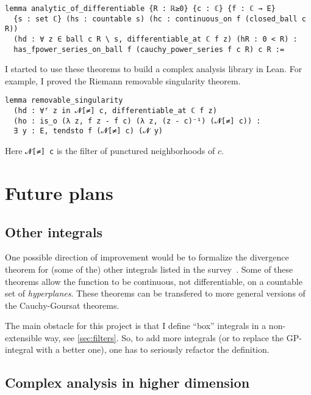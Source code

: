 \documentclass[a4paper, UKenglish,cleveref, autoref, thm-restate]{lipics-v2021}
\begin{document}
\begin{lstlisting}[caption=Analyticity of a complex differentiable function,label=lst:diff-analytic]
lemma analytic_of_differentiable {R : ℝ≥0} {c : ℂ} {f : ℂ → E}
  {s : set ℂ} (hs : countable s) (hc : continuous_on f (closed_ball c R))
  (hd : ∀ z ∈ ball c R \ s, differentiable_at ℂ f z) (hR : 0 < R) :
  has_fpower_series_on_ball f (cauchy_power_series f c R) c R :=
\end{lstlisting}

I started to use these theorems to build a complex analysis library in
Lean. For example, I proved the Riemann removable singularity theorem.

\begin{lstlisting}
lemma removable_singularity
  (hd : ∀ᶠ z in 𝓝[≠] c, differentiable_at ℂ f z)
  (ho : is_o (λ z, f z - f c) (λ z, (z - c)⁻¹) (𝓝[≠] c)) :
  ∃ y : E, tendsto f (𝓝[≠] c) (𝓝 y)
\end{lstlisting}

Here \lstinline{𝓝[≠] c} is the filter of punctured neighborhoods of
\(c\).

\section{Future plans}\label{sec:future-plans}

\subsection{Other integrals}\label{sec:other-integrals}

One possible direction of improvement would be to formalize the
divergence theorem for (some of the) other integrals listed in the
survey~\cite{BONGIORNO2002587}. Some of these theorems allow the
function to be continuous, not differentiable, on a countable set of
\emph{hyperplanes}. These theorems can be transfered to more general
versions of the Cauchy-Goursat theorems.

The main obstacle for this project is that I define \enquote{box}
integrals in a non-extensible way, see \autoref{sec:filters}. So, to
add more integrals (or to replace the GP-integral with a better one),
one has to seriously refactor the definition.

\subsection{Complex analysis in higher dimension}%
\label{sec:compl-analys-high}
\end{document}
